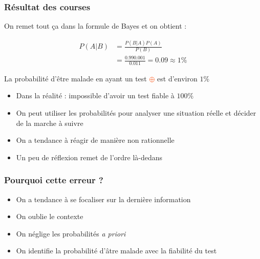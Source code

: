 \documentclass[usenames, dvipsnames]{beamer}
\begin{document}
\begin{frame}[plain]
\frametitle{Résultat des courses}

On remet tout ça dans la formule de Bayes et on obtient :

\begin{align*}
P(A|B) &= \frac{P(B|A)P(A)}{P(B)}\\
&= \frac{0.99 0.001}{0.011} = 0.09 \approx 1\%
\end{align*}


\pause
La probabilité d'être malade en ayant un test \textcolor{OrangeRed}{$\oplus$} est d'environ $1\%$

\pause

\begin{itemize}
\item Dans la réalité : impossible d'avoir un test fiable à $100\%$ \pause
\item On peut utiliser les probabilités pour analyser une situation réelle et décider de la marche à suivre \pause
\item On a tendance à réagir de manière non rationnelle\pause
\item Un peu de réflexion remet de l'ordre là-dedans\pause
\end{itemize}


\end{frame}


\begin{frame}[plain]
\frametitle{Pourquoi cette erreur ?}






\vspace{2cm}

\begin{itemize}
\item<2-> On a tendance à se focaliser sur la dernière information
\item<3-> On oublie le contexte
\item<4-> On néglige les probabilités \textit{a priori}
\item<5-> On identifie la probabilité d'âtre malade avec la fiabilité du test
\end{itemize}


\end{frame}
\end{document}
